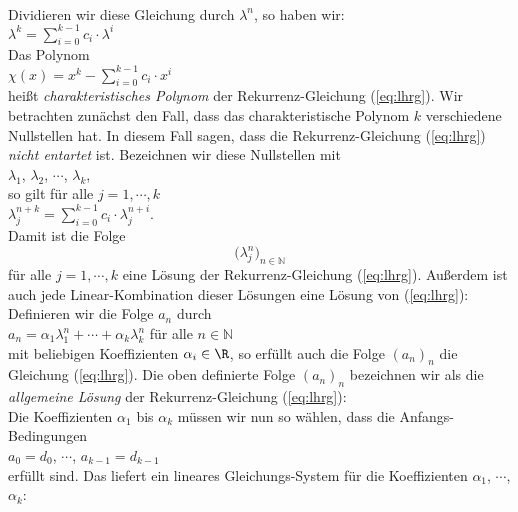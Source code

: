 \\[0.1cm]
Dividieren wir diese Gleichung durch $\lambda^n$, so haben wir: \\[0.1cm]
\hspace*{1.3cm} $\lambda^{k} = \sum\limits_{i=0}^{k-1} c_i \cdot \lambda^{i}$  
\\[0.1cm]
Das Polynom \\[0.1cm]
\hspace*{1.3cm} 
$\chi(x) = x^{k} - \sum\limits_{i=0}^{k-1} c_i \cdot x^{i}$  
\\[0.1cm]
 hei{\ss}t \emph{charakteristisches Polynom} der Rekurrenz-Gleichung (\ref{eq:lhrg}).
Wir betrachten zun\"achst den Fall, dass das charakteristische  Polynom  $k$  verschiedene
Nullstellen hat.  In diesem Fall sagen, dass die Rekurrenz-Gleichung (\ref{eq:lhrg}) 
\emph{nicht entartet} ist.
Bezeichnen wir diese Nullstellen mit \\[0.1cm]
\hspace*{1.3cm}  $\lambda_1$, $\lambda_2$, $\cdots$, $\lambda_k$, \\[0.1cm]
so  gilt f\"ur alle $j = 1,\cdots, k$ \\[0.1cm]
\hspace*{1.3cm} 
$\lambda_j^{n+k} = \sum\limits_{i=0}^{k-1} c_i \cdot \lambda_j^{n+i}$.
\\[0.1cm]
Damit ist die Folge  
\[\bigl(\lambda_j^n)_{n\in\mathbb{N}}\]
f\"ur alle $j=1,\cdots,k$ eine L\"osung der Rekurrenz-Gleichung (\ref{eq:lhrg}).
Au{\ss}erdem ist auch jede Linear-Kombination dieser L\"osungen eine L\"osung von (\ref{eq:lhrg}):
Definieren wir die Folge $a_n$ durch \\[0.1cm]
\hspace*{1.3cm} $a_n = \alpha_1 \lambda_1^n + \cdots + \alpha_k \lambda_k^n$ \quad f\"ur alle $n \in \mathbb{N}$ \\[0.1cm]
mit beliebigen Koeffizienten $\alpha_i \in \R$, so erf\"ullt auch die Folge
$(a_n)_n$ die Gleichung (\ref{eq:lhrg}).  Die oben definierte Folge $(a_n)_n$ bezeichnen wir als
die  \emph{allgemeine L\"osung} der Rekurrenz-Gleichung (\ref{eq:lhrg}): \\[0.1cm]
Die Koeffizienten $\alpha_1$ bis $\alpha_k$ m\"ussen wir nun so w\"ahlen, dass die
Anfangs-Bedingungen 
\\[0.2cm]
\hspace*{1.3cm}
$a_0 = d_0$, $\cdots$, $a_{k-1} = d_{k-1}$
\\[0.2cm]
erf\"ullt sind.  Das liefert ein lineares Gleichungs-System f\"ur die Koeffizienten $\alpha_1$, $\cdots$, $\alpha_k$:
